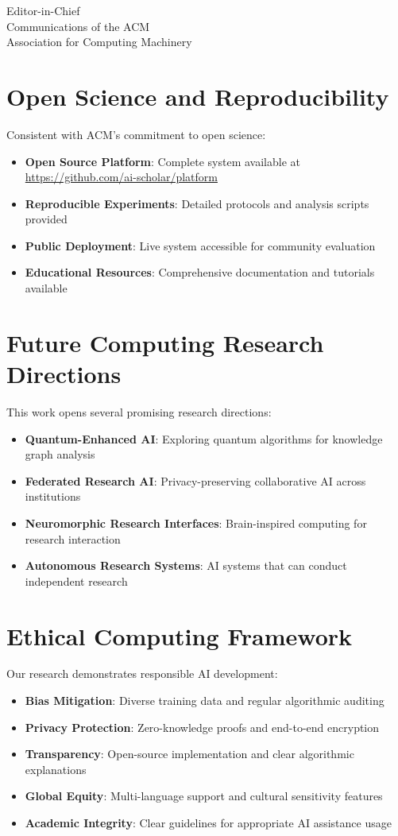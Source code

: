 \documentclass[11pt]{letter}
\begin{document}
\begin{letter}{Editor-in-Chief\\
Communications of the ACM\\
Association for Computing Machinery}
\section*{Open Science and Reproducibility}

Consistent with ACM's commitment to open science:

\begin{itemize}
    \item \textbf{Open Source Platform}: Complete system available at \url{https://github.com/ai-scholar/platform}
    \item \textbf{Reproducible Experiments}: Detailed protocols and analysis scripts provided
    \item \textbf{Public Deployment}: Live system accessible for community evaluation
    \item \textbf{Educational Resources}: Comprehensive documentation and tutorials available
\end{itemize}

\section*{Future Computing Research Directions}

This work opens several promising research directions:

\begin{itemize}
    \item \textbf{Quantum-Enhanced AI}: Exploring quantum algorithms for knowledge graph analysis
    \item \textbf{Federated Research AI}: Privacy-preserving collaborative AI across institutions
    \item \textbf{Neuromorphic Research Interfaces}: Brain-inspired computing for research interaction
    \item \textbf{Autonomous Research Systems}: AI systems that can conduct independent research
\end{itemize}

\section*{Ethical Computing Framework}

Our research demonstrates responsible AI development:

\begin{itemize}
    \item \textbf{Bias Mitigation}: Diverse training data and regular algorithmic auditing
    \item \textbf{Privacy Protection}: Zero-knowledge proofs and end-to-end encryption
    \item \textbf{Transparency}: Open-source implementation and clear algorithmic explanations
    \item \textbf{Global Equity}: Multi-language support and cultural sensitivity features
    \item \textbf{Academic Integrity}: Clear guidelines for appropriate AI assistance usage
\end{itemize}


\end{letter}
\end{document}
